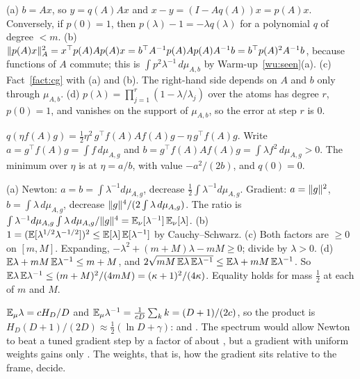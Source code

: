 (a) $b=Ax$, so $y=q(A)Ax$ and $x-y=(I-Aq(A))x=p(A)x$. Conversely, if $p(0)=1$, then $p(\lambda)-1=-\lambda q(\lambda)$
for a polynomial $q$ of degree $<m$.
\newline (b) $\lVert p(A)x\rVert_A^2=x^\top p(A)Ap(A)x=b^\top A^{-1}p(A)Ap(A)A^{-1}b=b^\top p(A)^2A^{-1}b$, because functions of $A$
commute; this is $\int p^2\lambda^{-1}\,d\mu_{A,b}$ by Warm-up~\ref{wu:seen}(a).
\newline (c) Fact~\ref{fact:cg} with (a) and (b). The right-hand side depends on $A$ and $b$ only through $\mu_{A,b}$.
\newline (d) $p(\lambda)=\prod_{j=1}^r(1-\lambda/\lambda_j)$ over the atoms has degree $r$, $p(0)=1$, and vanishes on the support
of $\mu_{A,b}$, so the error at step $r$ is 0.

$q(\eta f(A)g)=\frac12\eta^2\,g^\top f(A)Af(A)g-\eta\,g^\top f(A)g$. Write $a=g^\top f(A)g=\int f\,d\mu_{A,g}$ and
$b=g^\top f(A)Af(A)g=\int\lambda f^2\,d\mu_{A,g}>0$. The minimum over $\eta$ is at $\eta=a/b$, with value
$-a^2/(2b)$, and $q(0)=0$.

(a) Newton: $a=b=\int\lambda^{-1}d\mu_{A,g}$, decrease $\frac12\int\lambda^{-1}d\mu_{A,g}$. Gradient: $a=\lVert g\rVert^2$,
$b=\int\lambda\,d\mu_{A,g}$, decrease $\lVert g\rVert^4/(2\int\lambda\,d\mu_{A,g})$. The ratio is
$\int\lambda^{-1}d\mu_{A,g}\int\lambda\,d\mu_{A,g}/\lVert g\rVert^4=\mathbb{E}_\nu[\lambda^{-1}]\,\mathbb{E}_\nu[\lambda]$.
\newline (b) $1=(\mathbb{E}[\lambda^{1/2}\lambda^{-1/2}])^2\le\mathbb{E}[\lambda]\,\mathbb{E}[\lambda^{-1}]$ by Cauchy--Schwarz.
\newline (c) Both factors are $\ge0$ on $[m,M]$. Expanding, $-\lambda^2+(m+M)\lambda-mM\ge0$; divide by $\lambda>0$.
\newline (d) $\mathbb{E}\lambda+mM\,\mathbb{E}\lambda^{-1}\le m+M$, and $2\sqrt{mM\,\mathbb{E}\lambda\,\mathbb{E}\lambda^{-1}}\le\mathbb{E}\lambda+mM\,\mathbb{E}\lambda^{-1}$.
So $\mathbb{E}\lambda\,\mathbb{E}\lambda^{-1}\le(m+M)^2/(4mM)=(\kappa+1)^2/(4\kappa)$. Equality holds for mass $\frac12$ at each of
$m$ and $M$.

$\mathbb{E}_\mu\lambda=cH_D/D$ and $\mathbb{E}_\mu\lambda^{-1}=\frac1{cD}\sum_kk=(D+1)/(2c)$, so the product is
$H_D(D+1)/(2D)\approx\frac12(\ln D+\gamma)$: \NumKantFourK{} and \NumKantSixteenK. The spectrum would allow Newton to
beat a tuned gradient step by a factor of about \NumKantWorstFourK, but a gradient with uniform weights gains only
\NumKantFourK. The weights, that is, how the gradient sits relative to the frame, decide.

